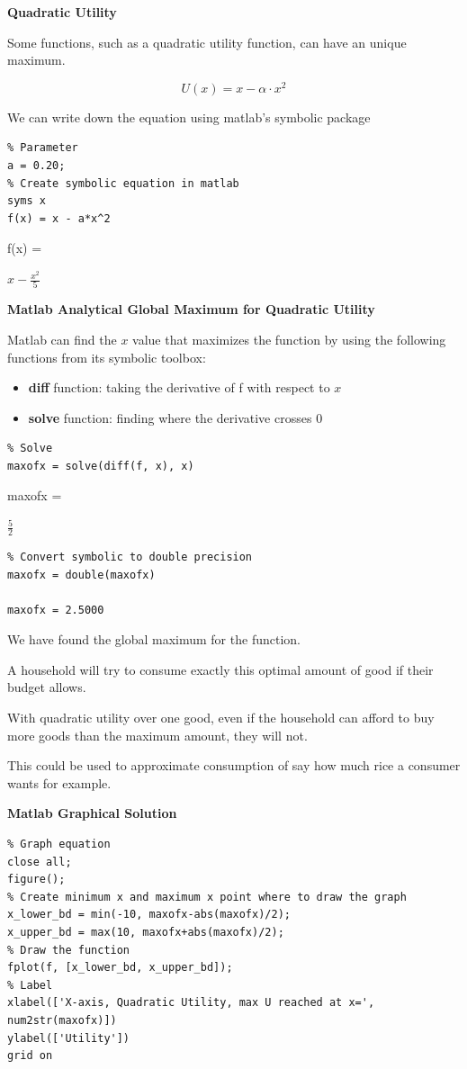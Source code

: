 \documentclass[
]{book}
\begin{document}
\textbf{Quadratic Utility}

Some functions, such as a quadratic utility function, can have an unique
maximum.

\[U(x)=x-\alpha \cdot x^2\]

We can write down the equation using matlab's symbolic package

\begin{verbatim}
% Parameter
a = 0.20;
% Create symbolic equation in matlab
syms x
f(x) = x - a*x^2
\end{verbatim}

f(x) =

\(\displaystyle x-\frac{x^2 }{5}\)

\textbf{Matlab Analytical Global Maximum for Quadratic Utility}

Matlab can find the \(x\) value that maximizes the function by using the
following functions from its symbolic toolbox:

\begin{itemize}
\item
  \textbf{diff} function: taking the derivative of f with respect to \(x\)
\item
  \textbf{solve} function: finding where the derivative crosses \(0\)
\end{itemize}

\begin{verbatim}
% Solve
maxofx = solve(diff(f, x), x)
\end{verbatim}

maxofx =

\(\displaystyle \frac{5}{2}\)

\begin{verbatim}
% Convert symbolic to double precision
maxofx = double(maxofx)

maxofx = 2.5000
\end{verbatim}

We have found the global maximum for the function.

A household will try to consume exactly this optimal amount of good if
their budget allows.

With quadratic utility over one good, even if the household can afford
to buy more goods than the maximum amount, they will not.

This could be used to approximate consumption of say how much rice a
consumer wants for example.

\textbf{Matlab Graphical Solution}

\begin{verbatim}
% Graph equation
close all;
figure();
% Create minimum x and maximum x point where to draw the graph
x_lower_bd = min(-10, maxofx-abs(maxofx)/2);
x_upper_bd = max(10, maxofx+abs(maxofx)/2);
% Draw the function
fplot(f, [x_lower_bd, x_upper_bd]);
% Label
xlabel(['X-axis, Quadratic Utility, max U reached at x=', num2str(maxofx)])
ylabel(['Utility'])
grid on
\end{verbatim}
\end{document}
